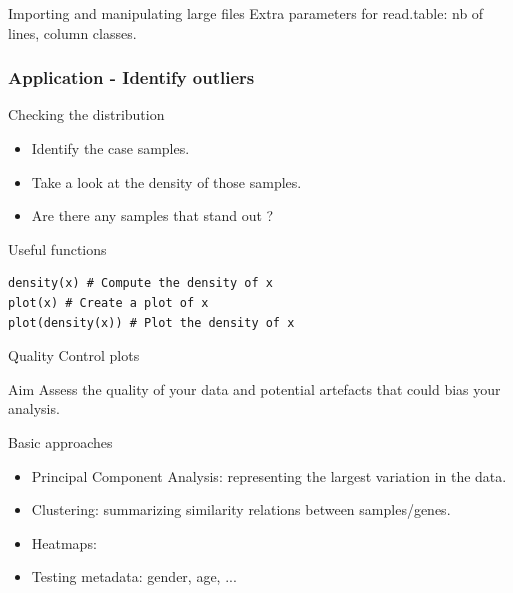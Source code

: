 \documentclass[10pt]{beamer}
\newenvironment{xframe}[2][]
  {\begin{frame}[fragile,environment=xframe,#1]
  \frametitle{#2}}
  {\end{frame}}
\begin{document}

\begin{frame}{Importing and manipulating large files}
  Extra parameters for read.table: nb of lines, column classes.
\end{frame}


\begin{xframe}{Application - Identify outliers}
  \begin{block}{Checking the distribution}
    \begin{itemize}
      \item Identify the {\sf case} samples. 
      \item Take a look at the density of those samples.
      \item Are there any samples that stand out ?
    \end{itemize}
  \end{block}
  \begin{exampleblock}{Useful functions}
\begin{verbatim}
density(x) # Compute the density of x
plot(x) # Create a plot of x
plot(density(x)) # Plot the density of x
\end{verbatim}
  \end{exampleblock}
\end{xframe}


\begin{frame}{Quality Control plots}
  \begin{block}{Aim}
    Assess the quality of your data and potential artefacts that could bias your analysis.
  \end{block}
  \begin{block}{Basic approaches}
    \begin{itemize}
    \item Principal Component Analysis: representing the largest variation in the data.
    \item Clustering: summarizing similarity relations between samples/genes.
    \item Heatmaps: 
    \item Testing metadata: gender, age, ...
    \end{itemize}
  \end{block}
\end{frame}
\end{document}
